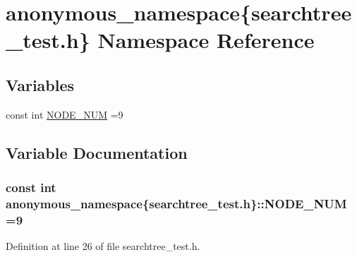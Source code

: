 \hypertarget{namespaceanonymous__namespace_02searchtree__test_8h_03}{}\section{anonymous\+\_\+namespace\{searchtree\+\_\+test.\+h\} Namespace Reference}
\label{namespaceanonymous__namespace_02searchtree__test_8h_03}
\subsection*{Variables}
\begin{DoxyCompactItemize}
\item 
const int \hyperlink{namespaceanonymous__namespace_02searchtree__test_8h_03_ac386a90cf11eb333ec452e8b3f1fcac4}{N\+O\+D\+E\+\_\+\+N\+U\+M} =9
\end{DoxyCompactItemize}


\subsection{Variable Documentation}
\hypertarget{namespaceanonymous__namespace_02searchtree__test_8h_03_ac386a90cf11eb333ec452e8b3f1fcac4}{}
\subsubsection[{N\+O\+D\+E\+\_\+\+N\+U\+M}]{\setlength{\rightskip}{0pt plus 5cm}const int anonymous\+\_\+namespace\{searchtree\+\_\+test.\+h\}\+::N\+O\+D\+E\+\_\+\+N\+U\+M =9}\label{namespaceanonymous__namespace_02searchtree__test_8h_03_ac386a90cf11eb333ec452e8b3f1fcac4}


Definition at line 26 of file searchtree\+\_\+test.\+h.

